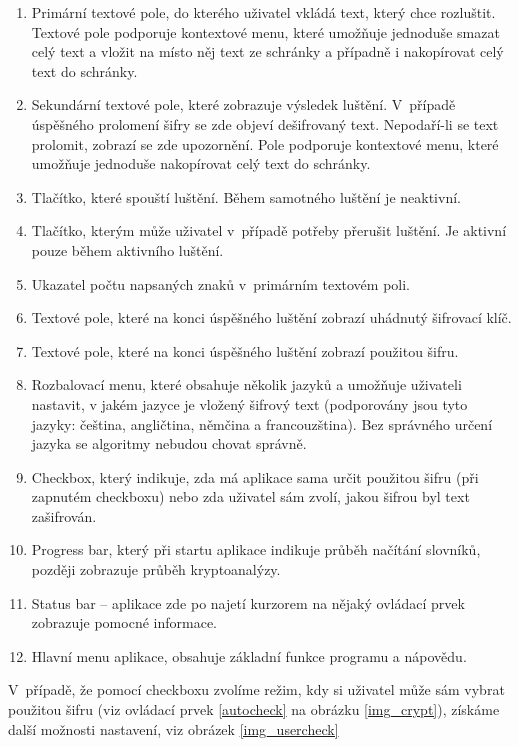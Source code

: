\documentclass[12pt]{article}
\theoremstyle{definition}
\begin{document}
\begin{enumerate}
\item Primární textové pole, do kterého uživatel vkládá text, který chce rozluštit. Textové pole podporuje kontextové menu, které umožňuje jednoduše smazat celý text a vložit na místo něj text ze schránky a případně i nakopírovat celý text do schránky.
\item Sekundární textové pole, které zobrazuje výsledek luštění. V~případě úspěšného prolomení šifry se zde objeví dešifrovaný text. Nepodaří-li se text prolomit, zobrazí se zde upozornění. Pole podporuje kontextové menu, které umožňuje jednoduše nakopírovat celý text do schránky. 
\item \label{startattack} Tlačítko, které spouští luštění. Během samotného luštění je neaktivní. 
\item Tlačítko, kterým může uživatel v~případě potřeby přerušit luštění. Je aktivní pouze během aktivního luštění. 
\item Ukazatel počtu napsaných znaků v~primárním textovém poli. 
\item Textové pole, které na konci úspěšného luštění zobrazí uhádnutý šifrovací klíč. 
\item Textové pole, které na konci úspěšného luštění zobrazí použitou šifru.
\item \label{langchoise} Rozbalovací menu, které obsahuje několik jazyků a umožňuje uživateli nastavit, v jakém jazyce je vložený šifrový text (podporovány jsou tyto jazyky: čeština, angličtina, němčina a francouzština). Bez správného určení jazyka se algoritmy nebudou chovat správně. 
\item \label{autocheck} Checkbox, který indikuje, zda má aplikace sama určit použitou šifru (při zapnutém checkboxu) nebo zda uživatel sám zvolí, jakou šifrou byl text zašifrován.
\item \label{progressbar} Progress bar, který při startu aplikace indikuje průběh načítání slovníků, později zobrazuje průběh kryptoanalýzy.
\item \label{statusbar} Status bar -- aplikace zde po najetí kurzorem na nějaký ovládací prvek zobrazuje pomocné informace.
\item \label{hlavnimenu} Hlavní menu aplikace, obsahuje základní funkce programu a nápovědu. 
\end{enumerate}

V~případě, že pomocí checkboxu zvolíme režim, kdy si uživatel může sám vybrat použitou šifru (viz ovládací prvek \ref{autocheck} na obrázku \ref{img_crypt}), získáme další možnosti nastavení, viz obrázek \ref{img_usercheck}
\end{document}
